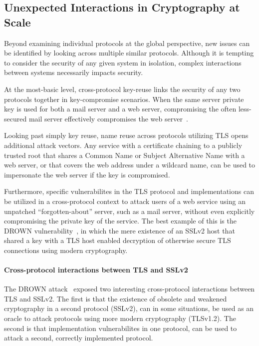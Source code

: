 \subsection{Unexpected Interactions in Cryptography at Scale}

Beyond examining individual protocols at the global perspective, new issues can
be identified by looking across multiple similar protocols. Although it is
tempting to consider the security of any given system in isolation, complex
interactions between systems necessarily impacts security.

At the most-basic level, cross-protocol key-reuse links the security of any two
protocols together in key-compromise scenarios. When the same server private
key is used for both a mail server and a web server, compromising the often
less-secured mail server effectively compromises the web
server~\cite{mail-2015}.

Looking past simply key reuse, name reuse across protocols utilizing TLS opens
additional attack vectors. Any service with a certificate chaining to a
publicly trusted root that shares a Common Name or Subject Alternative Name
with a web server, or that covers the web address under a wildcard name, can be
used to impersonate the web server if the key is compromised.

Furthermore, specific vulnerabilites in the TLS protocol and implementations
can be utilized in a cross-protocol context to attack users of a web service
using an unpatched ``forgotten-about'' server, such as a mail server, without
even explicitly compromising the private key of the service. The best example
of this is the DROWN vulnerability~\cite{drown-2016}, in which the mere
existence of an SSLv2 host that shared a key with a TLS host enabled decryption
of otherwise secure TLS connections using modern cryptography.

\paragraph{Cross-protocol interactions between TLS and SSLv2}

The DROWN attack~\cite{drown-2016} exposed two interesting cross-protocol
interactions between TLS and SSLv2. The first is that the existence of obsolete
and weakened cryptography in a second protocol (SSLv2), can in some situations,
be used as an oracle to attack protocols using more modern cryptography
(TLSv1.2). The second is that implementation vulnerabilites in one protocol,
can be used to attack a second, correctly implemented protocol.

